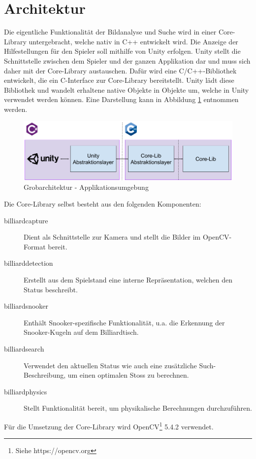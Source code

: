 \section{Architektur}

Die eigentliche Funktionalität der Bildanalyse und Suche wird in einer Core-Library untergebracht, welche nativ in C++ entwickelt wird.
Die Anzeige der Hilfestellungen für den Spieler soll mithilfe von Unity erfolgen. Unity stellt die Schnittstelle zwischen
dem Spieler und der ganzen Applikation dar und muss sich daher mit der Core-Library austauschen.
Dafür wird eine C/C++-Bibliothek entwickelt, die ein C-Interface zur Core-Library bereitstellt.
Unity lädt diese Bibliothek und wandelt erhaltene native Objekte in Objekte um, welche in Unity verwendet werden können.
Eine Darstellung kann in Abbildung \ref{fig:top-level-architecture} entnommen werden.

\begin{figure}[h!]
    \begin{center}
        \includegraphics[width=0.8\linewidth]{../common/03_billiard_ai/resources/00_top_level_architecture.png}
    \end{center}
    \caption{Grobarchitektur - Applikationsumgebung}
    \label{fig:top-level-architecture}
\end{figure}

Die Core-Library selbst besteht aus den folgenden Komponenten:
\begin{description}
    \item[billiard\textunderscore capture] Dient als Schnittstelle zur Kamera und stellt die Bilder im OpenCV-Format bereit.
    \item[billiard\textunderscore detection] Erstellt aus dem Spielstand eine interne Repräsentation, welchen den Status beschreibt.
    \item[billiard\textunderscore snooker] Enthält Snooker-spezifische Funktionalität, u.a. die Erkennung der Snooker-Kugeln auf dem Billiardtisch.
    \item[billiard\textunderscore search] Verwendet den aktuellen Status wie auch eine zusätzliche Such-Beschreibung, um einen optimalen
    Stoss zu berechnen.
    \item[billiard\textunderscore physics] Stellt Funktionalität bereit, um physikalische Berechnungen durchzuführen.
\end{description}

Für die Umsetzung der Core-Library wird OpenCV\footnote{Siehe https://opencv.org} 5.4.2 verwendet.

